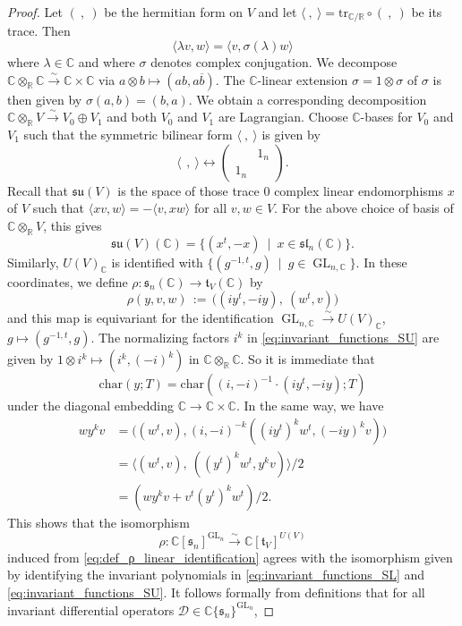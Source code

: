 \documentclass[reqno, 11pt]{amsart} %
\numberwithin{equation}{section}
\theoremstyle{plain}
\theoremstyle{definition}
\theoremstyle{remark}
\newcommand{\ov}{\overline}
\newcommand{\mr}{\mathrm}
\newcommand{\tensor}{\otimes}
\newcommand{\lr}{\longrightarrow}
\newcommand{\mbC}{\mathbb{C}}
\newcommand{\mbR}{\mathbb{R}}
\newcommand{\mcD}{\mathcal{D}}
\newcommand{\mfl}{\mathfrak{l}}
\newcommand{\mfs}{\mathfrak{s}}
\newcommand{\mft}{\mathfrak{t}}
\newcommand{\mfu}{\mathfrak{u}}
\newcommand{\mfsl}{\mfs\mfl}
\newcommand{\mfsu}{\mfs\mfu}
\newcommand{\simto}{\overset{\sim}{\to}}
\newcommand{\simlr}{\overset{\sim}{\lr}}
\DeclareMathOperator{\GL}{GL}
\begin{document}
\begin{proof}
Let $(\ ,\ )$ be the hermitian form on $V$ and let $\langle\ ,\ \rangle = \mr{tr}_{\mbC/\mbR}\circ (\ ,\ )$ be its trace. Then
$$\langle λv, w\rangle = \langle v, σ(λ)w\rangle$$
where $λ\in \mbC$ and where $σ$ denotes complex conjugation. We decompose $\mbC\tensor_\mbR\mbC\simto \mbC\times \mbC$ via $a\tensor b \mapsto (ab, a\ov b)$. The $\mbC$-linear extension $σ = 1\tensor σ$ of $σ$ is then given by $σ(a, b) = (b, a)$. We obtain a corresponding decomposition $\mbC\tensor_\mbR V \simto V_0\oplus V_1$ and both $V_0$ and $V_1$ are Lagrangian. Choose $\mbC$-bases for $V_0$ and $V_1$ such that the symmetric bilinear form $\langle\ ,\ \rangle$ is given by
$$\langle\ \,,\ \rangle \longleftrightarrow \begin{pmatrix}
&1_n \\ 1_n &
\end{pmatrix}.$$
Recall that $\mfsu(V)$ is the space of those trace $0$ complex linear endomorphisms $x$ of $V$ such that $\langle x v, w\rangle = -\langle v, x w\rangle$ for all $v,w\in V$. For the above choice of basis of $\mbC\tensor_\mbR V$, this gives
$$\mfsu(V)(\mbC) = \big\{(x^t, -x)\ \mid\ x \in \mfsl_n(\mbC)\big\}.$$
Similarly, $U(V)_\mbC$ is identified with $\{(g^{-1,t}, g)\ \mid\ g\in \GL_{n,\mbC}\}$. In these coordinates, we define $ρ:\mfs_n(\mbC)\to \mft_V(\mbC)$ by
\begin{equation}\label{eq:def_ρ_linear_identification}
ρ(y, v, w)\,:=\,\big((iy^t, -iy),\ (w^t, v)\big)
\end{equation}
and this map is equivariant for the identification $\GL_{n,\mbC}\simto U(V)_\mbC$, $g\mapsto (g^{-1,t}, g)$. The normalizing factors $i^k$ in \eqref{eq:invariant_functions_SU} are given by $1\tensor i^k \mapsto (i^k, (-i)^k)$ in $\mbC\tensor_\mbR\mbC$. So it is immediate that
$$\mr{char}(y;T) = \mr{char}((i,-i)^{-1}\cdot (iy^t, -iy); T)$$
under the diagonal embedding $\mbC\to \mbC\times \mbC$. In the same way, we have
$$\begin{aligned}
wy^kv & = \big((w^t,v), (i, -i)^{-k} ((iy^t)^kw^t, (-iy)^kv)\big)\\
& = \big\langle (w^t,v),\ ((y^t)^kw^t, y^kv)\big\rangle/2\\
& = (wy^kv + v^t(y^t)^kw^t)/2.
\end{aligned}$$
This shows that the isomorphism
$$ρ:\mbC[\mfs_n]^{\GL_n}\simlr \mbC[\mft_V]^{U(V)}$$
induced from \eqref{eq:def_ρ_linear_identification} agrees with the isomorphism given by identifying the invariant polynomials in \eqref{eq:invariant_functions_SL} and \eqref{eq:invariant_functions_SU}. It follows formally from definitions that for all invariant differential operators $\mcD\in \mbC\{\mfs_n\}^{\GL_n}$,

\end{proof}
\end{document}
